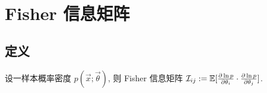 \chapter{Fisher 信息矩阵}

\section{定义}

设一样本概率密度 $p(\vec{x};\vec{\theta})$, 则 Fisher 信息矩阵 $\mathcal{I}_{ij}:=\mathbb{E}[\frac{\partial\ln p}{\partial \theta_i}\cdot\frac{\partial\ln p}{\partial \theta_j}]$.
